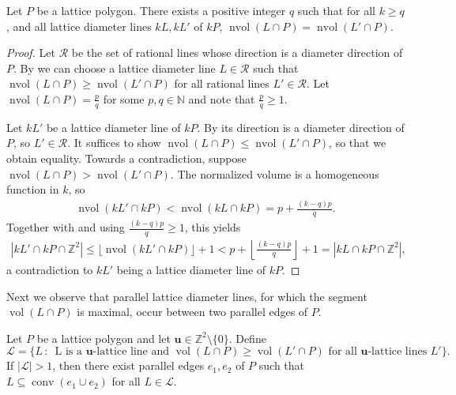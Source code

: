 \documentclass[11pt]{article}
\newcommand{\bu}{\mathbf{u}}
\newcommand{\Z}{\mathbb{Z}}
\newcommand{\N}{\mathbb{N}}
\newcommand{\Lcal}{\mathcal{L}}
\newcommand{\Rcal}{\mathcal{R}}
\DeclareMathOperator{\conv}{conv}
\DeclareMathOperator{\vol}{vol}
\DeclareMathOperator{\nvol}{nvol}
\newcommand{\st}{\, \mathrm{:}\,}
\begin{document}
\begin{lemma}\label{lemma:same-nvol}
    Let $P$ be a lattice polygon. There exists a positive integer $q$ such that for all $k\geq q$, and all lattice diameter lines $kL,kL'$ of $kP$, $\nvol(L \cap P)=\nvol(L' \cap P)$.
\end{lemma}

\begin{proof}
    Let $\Rcal$ be the set of rational lines whose direction is a diameter direction of $P$.
    By  we can choose a lattice diameter line $L \in \Rcal$ such that $\nvol(L \cap P) \geq \nvol(L' \cap P)$ for all rational lines $L' \in \Rcal$. Let $\nvol(L \cap P)=\frac{p}{q}$ for some $p,q \in \N$ and note that $\frac{p}{q} \geq 1$.

    Let $kL'$ be a lattice diameter line of $kP$. By  its direction is a diameter direction of $P$, so $L' \in \Rcal$. It suffices to show $\nvol(L \cap P) \leq \nvol(L' \cap P)$, so that we obtain equality. Towards a contradiction, suppose  $\nvol(L \cap P) > \nvol(L' \cap P)$. The normalized volume is a homogeneous function in $k$, so 
    \begin{align*}
        \nvol(kL' \cap kP) < \nvol(kL \cap kP) = p + \frac{(k-q)p}{q}.
    \end{align*}
    Together with  and using $\frac{(k-q)p}{q}\geq 1$, this yields
    \begin{align*}
        |kL' \cap kP \cap \Z^2| \leq \lfloor \nvol(kL' \cap kP)\rfloor +1 < p  + \left\lfloor \frac{(k-q)p}{q}\right\rfloor +1 = |kL \cap kP \cap \Z^2|,
    \end{align*}
    a contradiction to $kL'$ being a lattice diameter line of $kP$.
\end{proof}

Next we observe that parallel lattice diameter lines, for which the segment $\vol(L \cap P)$ is maximal, occur between two parallel edges of $P$.

\begin{lemma}\label{lemma:LD-in-chambers}
    Let $P$ be a lattice polygon and let $\bu \in \Z^2 \setminus \{0\}$. Define
    \[
    \Lcal = \{ L \st \text{ L is a $\bu$-lattice line and } \vol(L \cap P) \geq \vol(L' \cap P) \text{ for all $\bu$-lattice lines $L'$}\}.
    \]
    If $|\Lcal|>1$, then there exist parallel edges $e_1,e_2$ of $P$ such that $L \subseteq \conv(e_ 1 \cup e_2)$ for all $L \in \Lcal$.
\end{lemma}
\end{document}
